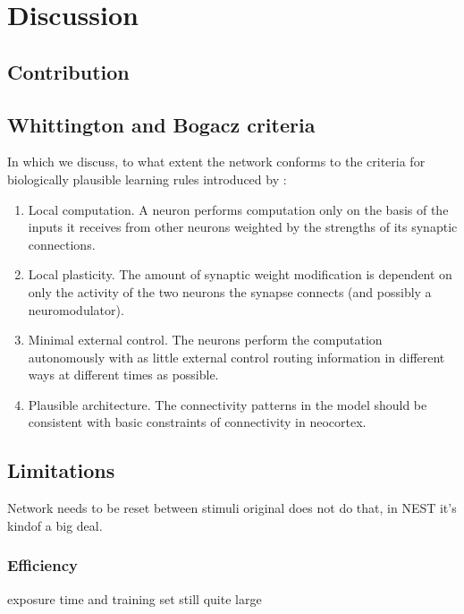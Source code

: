 
\chapter{Discussion}


\section{Contribution}




\section{Whittington and Bogacz criteria}

In which we discuss, to what extent the network conforms to the criteria for biologically plausible learning rules
introduced by \cite{Whittington2017}:
\begin{enumerate}
      \item Local computation. A neuron performs computation only on the basis
            of the inputs it receives from other neurons weighted by the strengths
            of its synaptic connections.
      \item  Local plasticity. The amount of synaptic weight modification is dependent on only the activity of the two
            neurons the synapse connects (and possibly a neuromodulator).
      \item  Minimal external control. The neurons perform the computation autonomously with as little external control
            routing information in different ways at different times as possible.
      \item   Plausible architecture. The connectivity patterns in the model should
            be consistent with basic constraints of connectivity in neocortex.
\end{enumerate}








\section{Limitations}

Network needs to be reset between stimuli
original does not do that, in NEST it's kindof a big deal.

\subsection*{Efficiency}
exposure time and training set still quite large


